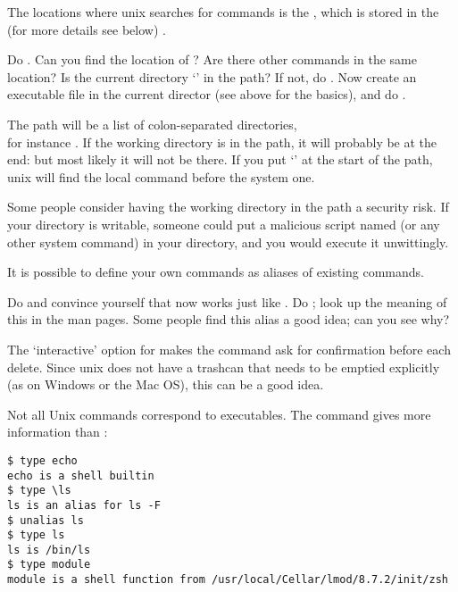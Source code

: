 The locations where unix searches for commands is the
,
which is stored in the  (for more
details see below) .

\begin{exercise}
  Do . Can you find the location of ?  Are there
  other commands in the same location? Is the current directory
  `' in the path? If not, do . Now
  create an executable file  in the current director (see above
  for the basics), and do .
\end{exercise}
\begin{outcome}
  The path will be a list of colon-separated directories,\\ for
  instance . If the working
  directory is in the path, it will probably be at the end:
    but most likely it will not be there. If you
  put `' at the start of the path, unix will find the local
   command before the system one.
\end{outcome}

Some people consider having the working directory in the path a
security risk. If your directory is writable, someone could put a
malicious script named  (or any other system command) in your
directory, and you would execute it unwittingly.

It is possible to define your own commands as aliases of existing
commands.

\begin{exercise}
  Do  and convince yourself that now  works
  just like . Do ; look up the meaning of
  this in the man pages. Some people find this alias a good idea; can
  you see why?
\end{exercise}
\begin{outcome}
  The  `interactive' option for  makes the command ask for
  confirmation before each delete. Since unix does not have a trashcan
  that needs to be emptied explicitly (as on Windows or the Mac OS),
  this can be a good idea.
\end{outcome}

\begin{remark}
  Not all Unix commands correspond to executables. The
   command gives more information than :
\begin{lstlisting}
$ type echo
echo is a shell builtin
$ type \ls
ls is an alias for ls -F
$ unalias ls
$ type ls
ls is /bin/ls
$ type module
module is a shell function from /usr/local/Cellar/lmod/8.7.2/init/zsh
\end{lstlisting}
\end{remark}

